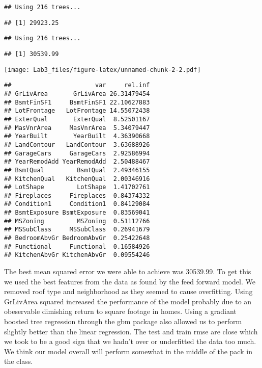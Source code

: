 \documentclass[
]{article}
\begin{document}
\begin{verbatim}
## Using 216 trees...
\end{verbatim}

\begin{verbatim}
## [1] 29923.25
\end{verbatim}

\begin{verbatim}
## Using 216 trees...
\end{verbatim}

\begin{verbatim}
## [1] 30539.99
\end{verbatim}

\texttt{[image: Lab3\_files/figure-latex/unnamed-chunk-2-2.pdf]}

\begin{verbatim}
##                       var     rel.inf
## GrLivArea       GrLivArea 26.31479454
## BsmtFinSF1     BsmtFinSF1 22.10627883
## LotFrontage   LotFrontage 14.55072438
## ExterQual       ExterQual  8.52501167
## MasVnrArea     MasVnrArea  5.34079447
## YearBuilt       YearBuilt  4.36390668
## LandContour   LandContour  3.63688926
## GarageCars     GarageCars  2.92586994
## YearRemodAdd YearRemodAdd  2.50488467
## BsmtQual         BsmtQual  2.49346155
## KitchenQual   KitchenQual  2.00346916
## LotShape         LotShape  1.41702761
## Fireplaces     Fireplaces  0.84374332
## Condition1     Condition1  0.84129084
## BsmtExposure BsmtExposure  0.83569041
## MSZoning         MSZoning  0.51112766
## MSSubClass     MSSubClass  0.26941679
## BedroomAbvGr BedroomAbvGr  0.25422648
## Functional     Functional  0.16584926
## KitchenAbvGr KitchenAbvGr  0.09554246
\end{verbatim}

The best mean squared error we were able to achieve was 30539.99. To get
this we used the best features from the data as found by the feed
forward model. We removed roof type and neighborhood as they seemed to
cause overfitting. Using GrLivArea squared increased the performance of
the model probably due to an obeservable dimishing return to square
footage in homes. Using a gradiant boosted tree regression through the
gbm package also allowed us to perform slightly better than the linear
regression. The test and train rmse are close which we took to be a good
sign that we hadn't over or underfitted the data too much. We think our
model overall will perform somewhat in the middle of the pack in the
class.
\end{document}
